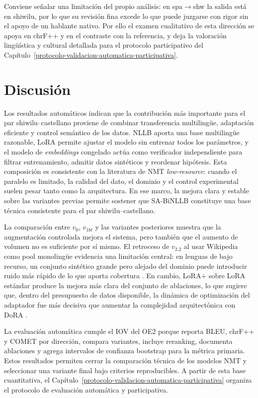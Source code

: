 \documentclass[12pt,a4paper,oneside]{book}
\begin{document}
Conviene señalar una limitación del propio análisis: en spa\(\rightarrow\)shw la salida está en shiwilu, por lo que su revisión fina excede lo que puede juzgarse con rigor sin el apoyo de un hablante nativo. Por ello el examen cualitativo de esta dirección se apoya en chrF++ y en el contraste con la referencia, y deja la valoración lingüística y cultural detallada para el protocolo participativo del Capítulo~\ref{protocolo-validacion-automatica-participativa}.

\section{Discusión}\label{nmt-discusion}

Los resultados automáticos indican que la contribución más importante para el par shiwilu--castellano proviene de combinar transferencia multilingüe, adaptación eficiente y control semántico de los datos. NLLB aporta una base multilingüe razonable, LoRA permite ajustar el modelo sin entrenar todos los parámetros, y el modelo de \emph{embeddings} congelado actúa como verificador independiente para filtrar entrenamiento, admitir datos sintéticos y reordenar hipótesis. Esta composición es consistente con la literatura de NMT \emph{low-resource}: cuando el paralelo es limitado, la calidad del dato, el dominio y el control experimental suelen pesar tanto como la arquitectura. En ese marco, la mejora clara y estable sobre las variantes previas permite sostener que SA-BiNLLB constituye una base técnica consistente para el par shiwilu--castellano.

La comparación entre \(v_0\), \(v_{1bt}\) y las variantes posteriores muestra que la augmentación controlada mejora el sistema, pero también que el aumento de volumen no es suficiente por sí mismo. El retroceso de \(v_{2.2}\) al usar Wikipedia como pool monolingüe evidencia una limitación central: en lenguas de bajo recurso, un conjunto sintético grande pero alejado del dominio puede introducir ruido más rápido de lo que aporta cobertura \parencite{edunov2018bt,hoang2018iterativebt}. En cambio, LoRA+ sobre LoRA estándar produce la mejora más clara del conjunto de ablaciones, lo que sugiere que, dentro del presupuesto de datos disponible, la dinámica de optimización del adaptador fue más decisiva que aumentar la complejidad arquitectónica con DoRA \parencite{hu2022lora,hayou2024loraplus}.

La evaluación automática cumple el IOV del OE2 porque reporta BLEU, chrF++ y COMET por dirección, compara variantes, incluye reranking, documenta ablaciones y agrega intervalos de confianza bootstrap para la métrica primaria. Estos resultados permiten cerrar la comparación técnica de los modelos NMT y seleccionar una variante final bajo criterios reproducibles. A partir de esta base cuantitativa, el Capítulo~\ref{protocolo-validacion-automatica-participativa} organiza el protocolo de evaluación automática y participativa.
\end{document}
